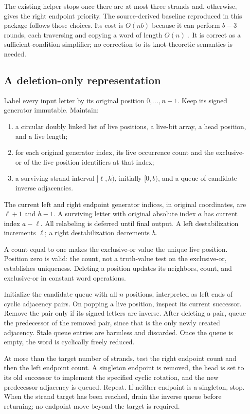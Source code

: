 \documentclass[11pt,letterpaper]{article}
\theoremstyle{definition}
\begin{document}
The existing helper stops once there are at most three strands and, otherwise, gives the right endpoint priority. The source-derived baseline reproduced in this package follows those choices. Its cost is $O(nb)$ because it can perform $b-3$ rounds, each traversing and copying a word of length $O(n)$ \cite{endpointsource}. It is correct as a sufficient-condition simplifier; no correction to its knot-theoretic semantics is needed.

\subsection{A deletion-only representation}
Label every input letter by its original position $0,\ldots,n-1$. Keep its signed generator immutable. Maintain:
\begin{enumerate}[label=(\alph*)]
\item a circular doubly linked list of live positions, a live-bit array, a head position, and a live length;
\item for each original generator index, its live occurrence count and the exclusive-or of the live position identifiers at that index;
\item a surviving strand interval $[\ell,h)$, initially $[0,b)$, and a queue of candidate inverse adjacencies.
\end{enumerate}
The current left and right endpoint generator indices, in original coordinates, are $\ell+1$ and $h-1$. A surviving letter with original absolute index $a$ has current index $a-\ell$. All relabeling is deferred until final output. A left destabilization increments $\ell$; a right destabilization decrements $h$.

A count equal to one makes the exclusive-or value the unique live position. Position zero is valid: the count, not a truth-value test on the exclusive-or, establishes uniqueness. Deleting a position updates its neighbors, count, and exclusive-or in constant word operations.

Initialize the candidate queue with all $n$ positions, interpreted as left ends of cyclic adjacency pairs. On popping a live position, inspect its current successor. Remove the pair only if its signed letters are inverse. After deleting a pair, queue the predecessor of the removed pair, since that is the only newly created adjacency. Stale queue entries are harmless and discarded. Once the queue is empty, the word is cyclically freely reduced.

At more than the target number of strands, test the right endpoint count and then the left endpoint count. A singleton endpoint is removed, the head is set to its old successor to implement the specified cyclic rotation, and the new predecessor adjacency is queued. Repeat. If neither endpoint is a singleton, stop. When the strand target has been reached, drain the inverse queue before returning; no endpoint move beyond the target is required.
\end{document}
